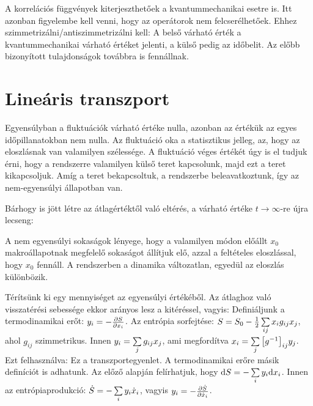   A korrelációs függvények kiterjeszthetőek a kvantummechanikai esetre is. Itt azonban figyelembe kell venni, hogy az operátorok nem felcserélhetőek. Ehhez szimmetrizálni/antiszimmetrizálni kell:
  A belső várható érték a kvantummechanikai várható értéket jelenti, a külső pedig az időbelit. Az előbb bizonyított tulajdonságok továbbra is fennállnak. 
  
 \section{Lineáris transzport}
  
  Egyensúlyban a fluktuációk várható értéke nulla, azonban az értékük az egyes időpillanatokban nem nulla. Az fluktuáció oka a statisztikus jelleg, az, hogy az eloszlásnak van valamilyen szélessége. A fluktuáció véges értékét úgy is el tudjuk érni, hogy a rendszerre valamilyen külső teret kapcsolunk, majd ezt a teret kikapcsoljuk. Amíg a teret bekapcsoltuk, a rendszerbe beleavatkoztunk, így az nem-egyensúlyi állapotban van.
  
  Bárhogy is jött létre az átlagértéktől való eltérés, a várható értéke $t\to\infty$-re újra lecseng:
  
  A nem egyensúlyi sokaságok lényege, hogy a valamilyen módon előállt $x_0$ makroállapotnak megfelelő sokaságot állítjuk elő, azzal a feltételes eloszlással, hogy $x_0$ fennáll. A rendszerben a dinamika változatlan, egyedül az eloszlás különbözik. 
  
  Térítsünk ki egy mennyiséget az egyensúlyi értékéből. Az átlaghoz való visszatérési sebessége ekkor arányos lesz a kitéréssel, vagyis:
  Definiáljunk a termodinamikai erőt: $y_i=-\frac{\partial S}{\partial x_i}$. Az entrópia sorfejtése: $S=S_0-\frac{1}{2}\sum\limits_{ij}^{}x_ig_{ij}x_j$, ahol $g_{ij}$ szimmetrikus. Innen $y_i=\sum\limits_{j}^{}g_{ij}x_j$, ami megfordítva $x_i=\sum\limits_{j}^{}\big[g^{-1}\big]_{ij}y_j$. Ezt felhasználva:
  Ez a transzportegyenlet. A termodinamikai erőre másik definíciót is adhatunk. Az előző alapján felírhatjuk, hogy $\mathrm{d} S=-\sum\limits_{i}^{}y_i\mathrm{d} x_i$. Innen az entrópiaprodukció: $\dot S=-\sum\limits_{i}^{}y_i\dot x_i$, vagyis $y_i=-\frac{\partial \dot S}{\partial \dot x_i}$. 
  
